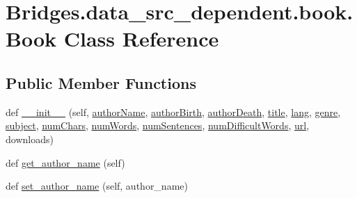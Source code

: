 \hypertarget{class_bridges_1_1data__src__dependent_1_1book_1_1_book}{}\section{Bridges.\+data\+\_\+src\+\_\+dependent.\+book.\+Book Class Reference}
\label{class_bridges_1_1data__src__dependent_1_1book_1_1_book}
\subsection*{Public Member Functions}
\begin{DoxyCompactItemize}
\item 
def \hyperlink{class_bridges_1_1data__src__dependent_1_1book_1_1_book_ae8d26fdb1c8218c6bbcf1cdbbbdf215c}{\+\_\+\+\_\+init\+\_\+\+\_\+} (self, \hyperlink{class_bridges_1_1data__src__dependent_1_1book_1_1_book_a310bc46cc12d008e68821aa0975e4f8b}{author\+Name}, \hyperlink{class_bridges_1_1data__src__dependent_1_1book_1_1_book_a4812efdfa5254d56c51ca4b66b1245ef}{author\+Birth}, \hyperlink{class_bridges_1_1data__src__dependent_1_1book_1_1_book_a0a5e0855570a88bd0044238da6cdb002}{author\+Death}, \hyperlink{class_bridges_1_1data__src__dependent_1_1book_1_1_book_a210b83d20030cb1da8e8d2a3a2279886}{title}, \hyperlink{class_bridges_1_1data__src__dependent_1_1book_1_1_book_a48743bf2013442dc0cd6fd288c2dd72b}{lang}, \hyperlink{class_bridges_1_1data__src__dependent_1_1book_1_1_book_a9c14172cd98eebd41d3bbe3aaaae979b}{genre}, \hyperlink{class_bridges_1_1data__src__dependent_1_1book_1_1_book_a90984ae814d6f7dc320daadde81f2580}{subject}, \hyperlink{class_bridges_1_1data__src__dependent_1_1book_1_1_book_afc6c0228803d19401e42b98d4c50decd}{num\+Chars}, \hyperlink{class_bridges_1_1data__src__dependent_1_1book_1_1_book_a3b98718ef5822bf7aae3fa46a78954d5}{num\+Words}, \hyperlink{class_bridges_1_1data__src__dependent_1_1book_1_1_book_a9bed1d08fa78753a0f8644aff50bfd4b}{num\+Sentences}, \hyperlink{class_bridges_1_1data__src__dependent_1_1book_1_1_book_a84df21d0ceb37624888e78966fb58507}{num\+Difficult\+Words}, \hyperlink{class_bridges_1_1data__src__dependent_1_1book_1_1_book_a243366fff7196a0f06e9dc5f4bc17b0e}{url}, downloads)
\item 
def \hyperlink{class_bridges_1_1data__src__dependent_1_1book_1_1_book_a91744b303ad4cfaa64b5a4641ae83212}{get\+\_\+author\+\_\+name} (self)
\item 
def \hyperlink{class_bridges_1_1data__src__dependent_1_1book_1_1_book_abd107d4a957f544a52844d996a702fb4}{set\+\_\+author\+\_\+name} (self, author\+\_\+name)

\end{DoxyCompactItemize}
